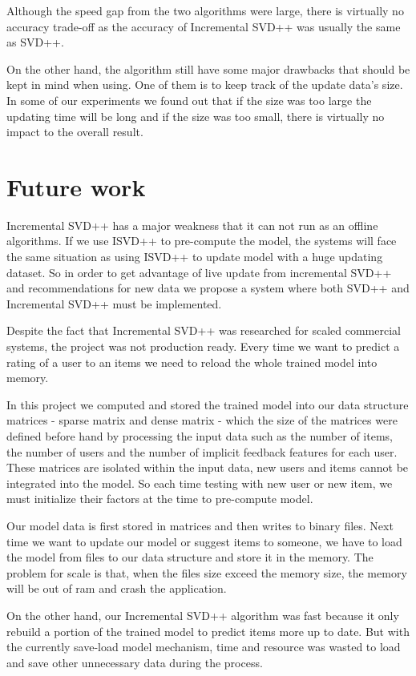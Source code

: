 \documentclass[oneside,13pt]{extreport}
\begin{document}
Although the speed gap from the two algorithms were large, there is virtually no accuracy trade-off as the accuracy of Incremental SVD++ was usually the same as SVD++.

On the other hand, the algorithm still have some major drawbacks that should be kept in mind when using. One of them is to keep track of the update data's size. In some of our experiments we found out that if the size was too large the updating time will be long and if the size was too small, there is virtually no impact to the overall result.

\section{Future work}
\label{future_work}
Incremental SVD++ has a major weakness that it can not run as an offline algorithms. If we use ISVD++ to pre-compute the model, the systems will face the same situation as using ISVD++ to update model with a huge updating dataset.  So in order to get advantage of live update from incremental SVD++ and recommendations for new data we propose a system where both SVD++ and Incremental SVD++ must be implemented.

Despite the fact that Incremental SVD++ was researched for scaled commercial systems, the project was not production ready. Every time we want to predict a rating of a user to an items we need to reload the whole trained model into memory. 

In this project we computed and stored the trained model into our data structure matrices - sparse matrix and dense matrix - which the size of the matrices were defined before hand by processing the input data such as the number of items, the number of users and the number of implicit feedback features for each user. These matrices are isolated within the input data, new users and items cannot be integrated into the model. So each time testing with new user or new item, we must initialize their factors at the time to pre-compute model.

Our model data is first stored in matrices and then writes to binary files. Next time we want to update our model or suggest items to someone, we have to load the model from files to our data structure and store it in the memory. The problem for scale is that, when the files size exceed the memory size, the memory will be out of ram and crash the application.

On the other hand, our Incremental SVD++ algorithm was fast because it only rebuild a portion of the trained model to predict items more up to date. But with the currently save-load model mechanism, time and resource was wasted to load and save other unnecessary data during the process.
\end{document}
